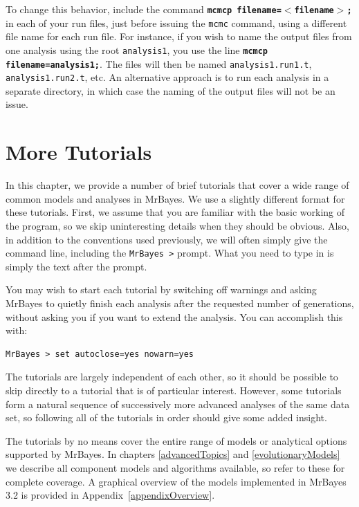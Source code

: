 \documentclass[12pt]{book}
\newcommand{\ttt}[1]{\texttt{#1}}
\newcommand{\tb}[1]{\ttt{\textbf{#1}}}
\begin{document}
To change this behavior, include the command \tb{mcmcp filename=$<$filename$>$;} in each of your
run files, just before issuing the \texttt{mcmc} command, using a different file name for each run
file. For instance, if you wish to name the output files from one analysis using the root
\texttt{analysis1}, you use the line \tb{mcmcp filename=analysis1;}. The files will then be named
\texttt{analysis1.run1.t}, \texttt{analysis1.run2.t}, etc. An alternative approach is to run each
analysis in a separate directory, in which case the naming of the output files will not be an
issue.

\chapter{More Tutorials}
\label{tutorialAdvanced}

In this chapter, we provide a number of brief tutorials that cover a wide range of common models
and analyses in MrBayes. We use a slightly different format for these tutorials. First, we assume
that you are familiar with the basic working of the program, so we skip uninteresting details when
they should be obvious. Also, in addition to the conventions used previously, we will often simply
give the command line, including the \texttt{MrBayes >} prompt. What you need to type in is simply the
text after the prompt.

You may wish to start each tutorial by switching off warnings and asking MrBayes to quietly finish
each analysis after the requested number of generations, without asking you if you want to extend
the analysis. You can accomplish this with: %

\begin{singlespacing}\small
\begin{verbatim}
MrBayes > set autoclose=yes nowarn=yes
\end{verbatim}
\normalsize
\end{singlespacing}

The tutorials are largely independent of each other, so it should be possible to skip directly to a
tutorial that is of particular interest. However, some tutorials form a natural sequence of
successively more advanced analyses of the same data set, so following all of the tutorials in
order should give some added insight.

The tutorials by no means cover the entire range of models or analytical options supported by
MrBayes. In chapters \ref{advancedTopics} and \ref{evolutionaryModels} we describe all component
models and algorithms available, so refer to these for complete coverage. A graphical
overview of the models implemented in MrBayes 3.2 is provided in Appendix~\ref{appendixOverview}. 
\end{document}
